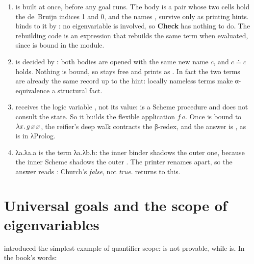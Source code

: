\begin{tutorial}
\begin{enumerate}
  \item {} is built at once, before any goal runs. The body is a pair whose
    two cells hold the de~Bruijn indices 1 and 0, and the names ,  survive only as
    printing hints.  binds  to it by : no eigenvariable is involved, so
    \textbf{Check} has nothing to do. The rebuilding code  is an
    expression that rebuilds the same term when evaluated, since  is bound in the module.
  \item {} is decided by : both bodies are opened with the same
    new name $c$, and $c\doteq c$ holds. Nothing is bound, so  stays free and prints as
    . In fact the two terms are already the same record up to the hint: locally nameless
    terms make α-equivalence a structural fact.
  \item {} receives the logic variable , not its value:  is a Scheme
    procedure and does not consult the state. So it builds the flexible application $f\,a$. Once  is bound to $\lambda x.\,g\,x\,x$, the reifier's deep walk contracts the
    β-redex, and the answer is , as  is in λProlog.
  \item λa.λa.a is the term λa.λb.b: the inner binder shadows the outer one, because the inner Scheme
     shadows the outer . The printer renames apart, so the answer reads
    : Church's \emph{false}, not \emph{true}.  returns to
    this.
\end{enumerate}
\end{tutorial}

\section{Universal goals and the scope of eigenvariables}\label{sec:examples-scope}

 introduced the simplest example of quantifier scope:  is
not provable, while  is. In the book's words:


